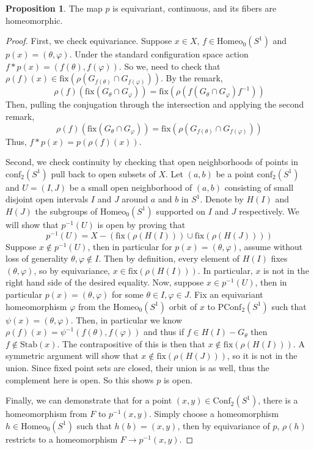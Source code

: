 \documentclass[10pt, oneside]{article}
\newcommand{\homeoS}{\text{Homeo}_0(S^1)}
\newcommand{\conf}[1]{\text{Conf}_{#1}(S^1)}
\newcommand{\pconf}[1]{\text{PConf}_{#1}(S^1)}
\theoremstyle{definition}
\newtheorem{prop}{Proposition}[section]
\theoremstyle{definition}
\begin{document}
\begin{prop}
    The map $p$ is equivariant, continuous, and its fibers are homeomorphic.
\end{prop}
\begin{proof}
    First, we check equivariance. Suppose $x\in X$, $f\in\homeoS$ and $p(x)=(\theta, \varphi)$. Under the standard configuration space action $f*p(x) = (f(\theta), f(\varphi))$. So we, need to check that $\rho(f)(x)\in \text{fix}(\rho(G_{f(\theta)}\cap G_{f(\varphi)}))$. By the remark, $$\rho(f)(\text{fix}(G_\theta \cap G_\varphi)) = \text{fix}(\rho(f(G_\theta\cap G_\varphi)f^{-1}))$$
    Then, pulling the conjugation through the intersection and applying the second remark,
    $$\rho(f)(\text{fix}(G_\theta \cap G_\varphi)) = \text{fix}(\rho(G_{f(\theta)}\cap G_{f(\varphi)}))$$
    Thus, $f*p(x) = p(\rho(f)(x))$.

    Second, we check continuity by checking that open neighborhoods of points in $\text{conf}_2(S^1)$ pull back to open subsets of $X$. Let $(a, b)$ be a point $\text{conf}_2(S^1)$ and $U = (I, J)$ be a small open neighborhood of $(a,b)$ consisting of small disjoint open intervals $I$ and $J$ around $a$ and $b$ in $S^1$. Denote by $H(I)$ and $H(J)$ the subgroups of $\homeoS$ supported on $I$ and $J$ respectively. We will show that $p^{-1}(U)$ is open by proving that 
    $$p^{-1}(U) = X - \left(\text{fix}(\rho(H(I)))\cup\text{fix}(\rho(H(J)))\right)$$
    Suppose $x\notin p^{-1}(U)$, then in particular for $p(x) = (\theta, \varphi)$, assume without loss of generality $\theta, \varphi \notin I$. Then by definition, every element of $H(I)$ fixes $(\theta, \varphi)$, so by equivariance, $x\in \text{fix}(\rho(H(I)))$. In particular, $x$ is not in the right hand side of the desired equality. Now, suppose $x\in p^{-1}(U)$, then in particular $p(x) = (\theta, \varphi)$ for some $\theta\in I, \varphi\in J$. Fix an equivariant homeomorphism $\varphi$ from the $\homeoS$ orbit of $x$ to $\pconf{2}$ such that $\psi(x) = (\theta, \varphi)$. Then, in particular we know $\rho(f)(x) = \psi^{-1}(f(\theta), f(\varphi))$ and thus if $f\in H(I) - G_\theta$ then $f\notin \text{Stab}(x)$. The contrapositive of this is then that $x\notin \text{fix}(\rho(H(I)))$. A symmetric argument will show that $x\notin \text{fix}(\rho(H(J)))$, so it is not in the union. Since fixed point sets are closed, their union is as well, thus the complement here is open. So this shows $p$ is open.

    Finally, we can demonstrate that for a point $(x,y)\in\conf{2}$, there is a homeomorphism from $F$ to $p^{-1}(x, y)$. Simply choose a homeomorphism $h\in\homeoS$ such that $h(b) = (x, y)$, then by equivariance of $p$, $\rho(h)$ restricts to a homeomorphism $F\to p^{-1}(x,y)$.
\end{proof}
\end{document}

